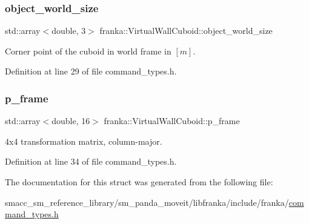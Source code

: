 \subsubsection{\texorpdfstring{object\+\_\+world\+\_\+size}{object\_world\_size}}
{\footnotesize\ttfamily std\+::array$<$double, 3$>$ franka\+::\+Virtual\+Wall\+Cuboid\+::object\+\_\+world\+\_\+size}

Corner point of the cuboid in world frame in $[m]$. 

Definition at line 29 of file command\+\_\+types.\+h.

\mbox{\label{structfranka_1_1VirtualWallCuboid_ab34ba4f99676a36a4e1171fd8b431391}} 
\subsubsection{\texorpdfstring{p\+\_\+frame}{p\_frame}}
{\footnotesize\ttfamily std\+::array$<$double, 16$>$ franka\+::\+Virtual\+Wall\+Cuboid\+::p\+\_\+frame}

4x4 transformation matrix, column-\/major. 

Definition at line 34 of file command\+\_\+types.\+h.



The documentation for this struct was generated from the following file\+:\begin{DoxyCompactItemize}
\item 
smacc\+\_\+sm\+\_\+reference\+\_\+library/sm\+\_\+panda\+\_\+moveit/libfranka/include/franka/\hyperlink{command__types_8h}{command\+\_\+types.\+h}\end{DoxyCompactItemize}
